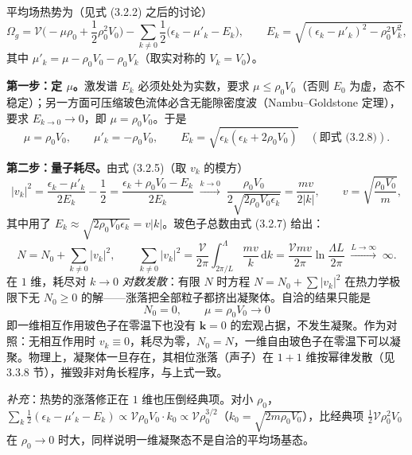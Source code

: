 平均场热势为（见式 (3.2.2) 之后的讨论）
\begin{equation*}
\Omega_g=\mathcal{V}\Big(-\mu\rho_0+\frac{1}{2}\rho_0^{2}V_0\Big)
-\sum_{k\neq0}\frac{1}{2}\big(\epsilon_k-\mu'_k-E_k\big),
\qquad
E_k=\sqrt{(\epsilon_k-\mu'_k)^{2}-\rho_0^{2}V_k^{2}},
\end{equation*}
其中 $\mu'_k=\mu-\rho_0V_0-\rho_0V_k$（取实对称的 $V_k=V_0$）。

\textbf{第一步：定 $\mu$。}激发谱 $E_k$ 必须处处为实数，要求 $\mu\le\rho_0V_0$（否则 $E_0$ 为虚，态不稳定）；另一方面可压缩玻色流体必含无能隙密度波（Nambu--Goldstone 定理），要求 $E_{k\to0}\to0$，即 $\mu=\rho_0V_0$。于是
\begin{equation*}
\mu=\rho_0V_0,\qquad
\mu'_k=-\rho_0V_0,\qquad
E_k=\sqrt{\epsilon_k(\epsilon_k+2\rho_0V_0)}
\quad(\text{即式 (3.2.8)}).
\end{equation*}

\textbf{第二步：量子耗尽。}由式 (3.2.5)（取 $v_k$ 的模方）
\begin{equation*}
|v_k|^{2}=\frac{\epsilon_k-\mu'_k}{2E_k}-\frac12
=\frac{\epsilon_k+\rho_0V_0-E_k}{2E_k}
\;\xrightarrow{k\to0}\;
\frac{\rho_0V_0}{2\sqrt{2\rho_0V_0\epsilon_k}}
=\frac{mv}{2|k|},
\qquad v=\sqrt{\frac{\rho_0V_0}{m}} ,
\end{equation*}
其中用了 $E_k\approx\sqrt{2\rho_0V_0\epsilon_k}=v|k|$。玻色子总数由式 (3.2.7) 给出：
\begin{equation*}
N=N_0+\sum_{k\neq0}|v_k|^{2},
\qquad
\sum_{k\neq0}|v_k|^{2}
=\frac{\mathcal{V}}{2\pi}\int_{2\pi/L}^{\Lambda}\frac{mv}{k}\,\mathrm{d}k
=\frac{\mathcal{V}mv}{2\pi}\ln\frac{\Lambda L}{2\pi}\;\xrightarrow{L\to\infty}\;\infty .
\end{equation*}
在 $1$ 维，耗尽对 $k\to0$ \emph{对数发散}：有限 $N$ 时方程 $N=N_0+\sum|v_k|^{2}$ 在热力学极限下无 $N_0\ge0$ 的解——涨落把全部粒子都挤出凝聚体。自洽的结果只能是
\begin{equation*}
\boxed{\;N_0=0,\qquad \mu=\rho_0V_0\to0\;}
\end{equation*}
即一维相互作用玻色子在零温下也没有 $\pmb{k}=0$ 的宏观占据，不发生凝聚。作为对照：无相互作用时 $v_k\equiv0$，耗尽为零，$N_0=N$，一维自由玻色子在零温下可以凝聚。物理上，凝聚体一旦存在，其相位涨落（声子）在 $1+1$ 维按幂律发散（见 3.3.8 节），摧毁非对角长程序，与上式一致。

\emph{补充}：热势的涨落修正在 $1$ 维也压倒经典项。对小 $\rho_0$，$\sum_k\frac12(\epsilon_k-\mu'_k-E_k)\propto\mathcal{V}\rho_0V_0\cdot k_0\propto\mathcal{V}\rho_0^{3/2}$（$k_0=\sqrt{2m\rho_0V_0}$），比经典项 $\frac12\mathcal{V}\rho_0^{2}V_0$ 在 $\rho_0\to0$ 时大，同样说明一维凝聚态不是自洽的平均场基态。


